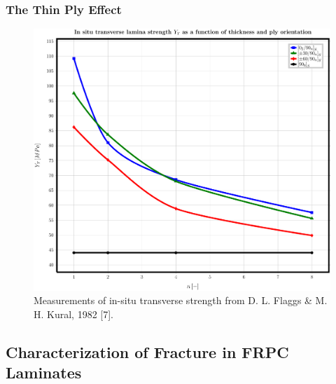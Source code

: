 \documentclass[first,firstsupp,lastsupp,last,hyperref,table]{ETHclass}
\begin{document}
\begin{frame}
\frametitle{\small The Thin Ply Effect}
\vspace{-0.5cm}
\centering
\begin{figure}[!h]
\centering
\includegraphics[height=0.75\textheight]{Flaggs-Kural_InSituTransverseStrength.pdf}
\caption{\tiny Measurements of in-situ transverse strength from D. L. Flaggs \& M. H. Kural, 1982 [7].}
 \label{fig:in-situ-strength}
\end{figure}
\end{frame}

\subsection[Characterization of Fracture in FRPC]{Characterization of Fracture in FRPC Laminates}
\end{document}
